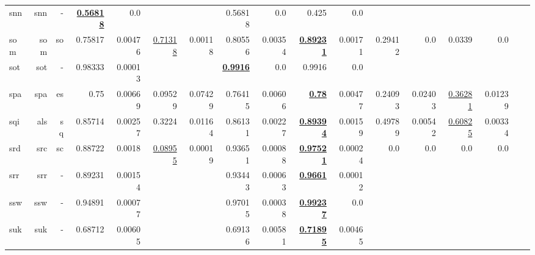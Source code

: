 \documentclass[11pt]{article}
\begin{document}
\begin{table*}[h]
{\begin{tabular}{lrrrrrrrrrrrrrrrr}
snn         & snn         & -         & \textbf{\underline{0.56818}}         & 0.0         &          &          & 0.56818         & 0.0         & 0.425         & 0.0         &          &          &          &          \\
som         & som         & so         & 0.75817         & 0.00476         & \underline{0.71318}         & 0.00118         & 0.80556         & 0.00354         & \textbf{\underline{0.89231}}         & 0.00171         & 0.29412         & 0.0         & 0.0339         & 0.0         \\
sot         & sot         & -         & 0.98333         & 0.00013         &          &          & \textbf{\underline{0.9916}}         & 0.0         & 0.9916         & 0.0         &          &          &          &          \\
spa         & spa         & es         & 0.75         & 0.00669         & 0.09529         & 0.07429         & 0.76415         & 0.00606         & \textbf{\underline{0.78}}         & 0.00477         & 0.24093         & 0.02403         & \underline{0.36281}         & 0.01239         \\
sqi         & als         & sq         & 0.85714         & 0.00257         & 0.3224         & 0.01164         & 0.86131         & 0.00227         & \textbf{\underline{0.89394}}         & 0.00159         & 0.49789         & 0.00542         & \underline{0.60825}         & 0.00334         \\
srd         & src         & sc         & 0.88722         & 0.0018         & \underline{0.08955}         & 0.00019         & 0.93651         & 0.00088         & \textbf{\underline{0.97521}}         & 0.00024         & 0.0         & 0.0         & 0.0         & 0.0         \\
srr         & srr         & -         & 0.89231         & 0.00154         &          &          & 0.93443         & 0.00063         & \textbf{\underline{0.9661}}         & 0.00012         &          &          &          &          \\
ssw         & ssw         & -         & 0.94891         & 0.00077         &          &          & 0.97015         & 0.00038         & \textbf{\underline{0.99237}}         & 0.0         &          &          &          &          \\
suk         & suk         & -         & 0.68712         & 0.00605         &          &          & 0.69136         & 0.00581         & \textbf{\underline{0.71895}}         & 0.00465         &          &          &          &          \\

\end{tabular}}
\end{table*}
\end{document}
